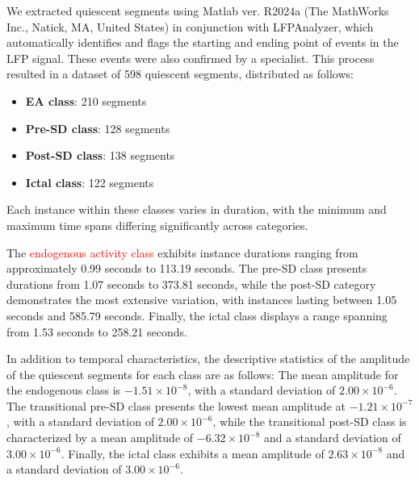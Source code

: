 \documentclass{article}
\begin{document}
We extracted quiescent segments using Matlab ver. R2024a (The MathWorks Inc., Natick, MA, United States) in conjunction with LFPAnalyzer, which automatically identifies and flags the starting and ending point of events in the LFP signal. These events were also confirmed by a specialist. This process resulted in a dataset of 598 quiescent segments, distributed as follows: 
\begin{itemize}
    \item \textbf{EA class}: 210 segments
    \item \textbf{Pre-SD class}: 128 segments
    \item \textbf{Post-SD class}: 138 segments
    \item \textbf{Ictal class}: 122 segments
\end{itemize}
Each instance within these classes varies in duration, with the minimum and maximum time spans differing significantly across categories.

The \textcolor{red}{endogenous activity class} exhibits instance durations ranging from approximately 0.99 seconds to 113.19 seconds. The pre-SD class presents durations from 1.07 seconds to 373.81 seconds, while the post-SD category demonstrates the most extensive variation, with instances lasting between 1.05 seconds and 585.79 seconds. Finally, the ictal class displays a range spanning from 1.53 seconds to 258.21 seconds.

In addition to temporal characteristics, the descriptive statistics of the amplitude of the quiescent segments for each class are as follows: The mean amplitude for the endogenous class is $-1.51 \times 10^{-8}$, with a standard deviation of $2.00 \times 10^{-6}$. The transitional pre-SD class presents the lowest mean amplitude at $-1.21 \times 10^{-7}$, with a standard deviation of $2.00 \times 10^{-6}$, while the transitional post-SD class is characterized by a mean amplitude of $-6.32 \times 10^{-8}$ and a standard deviation of $3.00 \times 10^{-6}$. Finally, the ictal class exhibits a mean amplitude of $2.63 \times 10^{-8}$ and a standard deviation of $3.00 \times 10^{-6}$. 
\end{document}
